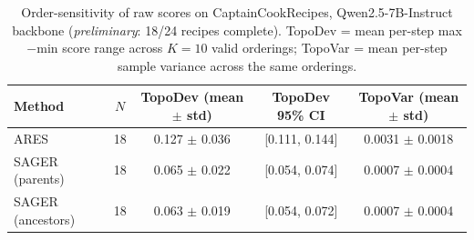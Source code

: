%
%

\begin{table}[h]
\centering
\caption{Order-sensitivity of raw scores on CaptainCookRecipes,
  Qwen2.5-7B-Instruct backbone (\emph{preliminary}: 18/24 recipes complete).
  TopoDev = mean per-step max$-$min score range across $K=10$ valid orderings;
  TopoVar = mean per-step sample variance across the same orderings.}\label{tab:sager-qwen-topodev-partial}
\begin{tabular}{lcccc}
\toprule
Method & $N$ & TopoDev (mean $\pm$ std) & TopoDev 95\% CI & TopoVar (mean $\pm$ std) \\
\midrule
ARES               & 18 & 0.127 $\pm$ 0.036 & [0.111, 0.144] & 0.0031 $\pm$ 0.0018 \\
SAGER (parents)     & 18 & 0.065 $\pm$ 0.022 & [0.054, 0.074] & 0.0007 $\pm$ 0.0004 \\
SAGER (ancestors)   & 18 & 0.063 $\pm$ 0.019 & [0.054, 0.072] & 0.0007 $\pm$ 0.0004 \\
\bottomrule
\end{tabular}
\end{table}

